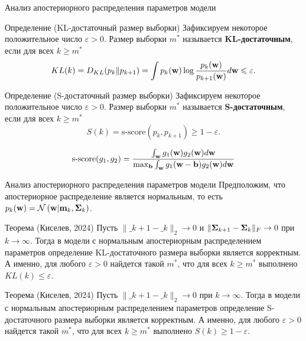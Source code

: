 \documentclass[10pt]{beamer}
\begin{document}
\begin{frame}{Анализ апостериорного распределения параметров модели}
    \begin{block}{Определение (KL-достаточный размер выборки)}
        Зафиксируем некоторое положительное число $\varepsilon > 0$. Размер выборки $m^*$ называется \textbf{KL-достаточным}, если для всех $k \geqslant m^*$
        \[ KL(k) = D_{KL}(p_k \| p_{k+1}) = \int p_k(\mathbf{w}) \log{\dfrac{p_k(\mathbf{w})}{p_{k+1}(\mathbf{w})}} d\mathbf{w} \leqslant \varepsilon. \]
    \end{block}
    \vspace{-0.5cm}
    \begin{block}{Определение (S-достаточный размер выборки)}
        Зафиксируем некоторое положительное число $\varepsilon > 0$. Размер выборки $m^*$ называется \textbf{S-достаточным}, если для всех $k \geqslant m^*$
        \[ S(k) = \text{s-score}(p_k, p_{k+1}) \geqslant 1-\varepsilon. \]
    \end{block}
    \vspace{-0.5cm}
    \[ \text{s-score}(g_1, g_2) = \dfrac{\int_{\mathbf{w}} g_1(\mathbf{w}) g_2(\mathbf{w}) d\mathbf{w}}{\max_{\mathbf{b}} \int_{\mathbf{w}} g_1(\mathbf{w} - \mathbf{b}) g_2(\mathbf{w}) d\mathbf{w}} \]
\end{frame}
\begin{frame}{Анализ апостериорного распределения параметров модели}
    Предположим, что апостериорное распределение является нормальным, то есть $p_k(\mathbf{w}) = \mathcal{N}\left( \mathbf{w} | \mathbf{m}_k, \boldsymbol{\Sigma}_k \right)$.
    \vfill
    \begin{block}{Теорема (Киселев, 2024)}
        Пусть $\| \bm_{k+1} - \bm_k \|_2 \to 0$ и $\| \boldsymbol{\Sigma}_{k+1} - \boldsymbol{\Sigma}_k \|_{F} \to 0$ при $k \to \infty$. Тогда в модели с нормальным апостериорным распределением параметров определение KL-достаточного размера выборки является корректным. А именно, для любого $\varepsilon > 0$ найдется такой $m^*$, что для всех $k \geqslant m^*$ выполнено $KL(k) \leqslant \varepsilon$.
    \end{block}
    \vfill
    \begin{block}{Теорема (Киселев, 2024)}
        Пусть $\| \bm_{k+1} - \bm_k \|_2 \to 0$ при $k \to \infty$. Тогда в модели с нормальным апостериорным распределением параметров определение S-достаточного размера выборки является корректным. А именно, для любого $\varepsilon > 0$ найдется такой $m^*$, что для всех $k \geqslant m^*$ выполнено $S(k) \geqslant 1-\varepsilon$.
    \end{block}
\end{frame}
\end{document}
